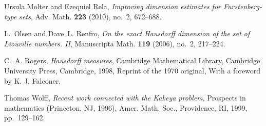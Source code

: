 \documentclass[11pt,a4paper]{amsart}
\begin{document}
\begin{thebibliography}{Wol99}
Ursula Molter and Ezequiel Rela, \emph{Improving dimension estimates for
  {F}ur\-sten\-berg-type sets}, Adv. Math. \textbf{223} (2010), no.~2,
  672--688.

L.~Olsen and Dave~L. Renfro, \emph{On the exact {H}ausdorff dimension of the
  set of {L}iouville numbers. {II}}, Manuscripta Math. \textbf{119} (2006),
  no.~2, 217--224.

C.~A. Rogers, \emph{Hausdorff measures}, Cambridge Mathematical Library,
  Cambridge University Press, Cambridge, 1998, Reprint of the 1970 original,
  With a foreword by K. J. Falconer.

Thomas Wolff, \emph{Recent work connected with the {K}akeya problem}, Prospects
  in mathematics (Princeton, NJ, 1996), Amer. Math. Soc., Providence, RI, 1999,
  pp.~129--162.

\end{thebibliography}

 
\end{document}
